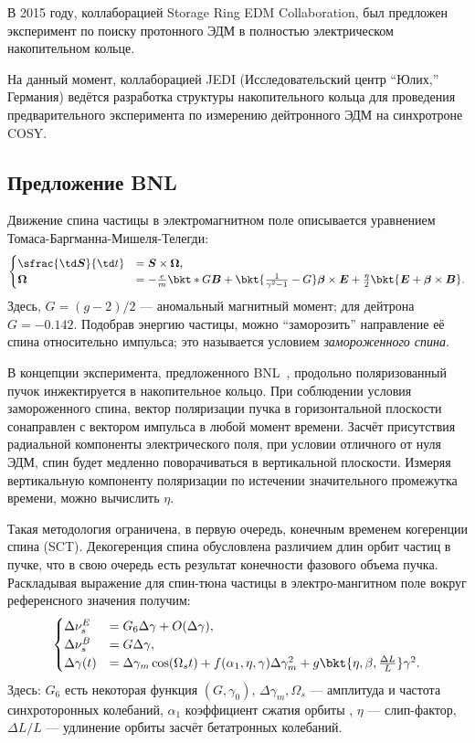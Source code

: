 \documentclass{article}
\newcommand{\bld}{\boldsymbol}
\begin{document}
	В 2015 году, коллаборацией Storage Ring EDM Collaboration, был предложен эксперимент по поиску протонного ЭДМ в полностью электрическом накопительном кольце.~\cite{Proton_EDM}
	
	На данный момент, коллаборацией JEDI (Исследовательский центр ``Юлих,'' Германия) ведётся разработка структуры накопительного кольца для проведения предварительного эксперимента по измерению дейтронного ЭДМ на синхротроне COSY.
	
	\subsection{Предложение BNL}
	Движение спина частицы в электромагнитном поле описывается уравнением Томаса-Баргманна-Мишеля-Телегди:
	\begin{equation*}
	\begin{cases}
	\sfrac{\td\bld S}{\td t} &=\bld S \times\bld \Omega,\\
	\bld \Omega &= -\frac em \bkt*{G\bld B + \bkt{\frac 1 {\gamma^2 - 1} - G}\bld \beta \times\bld E + \frac\eta2 \bkt{\bld E +\bld\beta\times\bld B}}.
	\end{cases}
	\end{equation*}
	Здесь, $G = (g-2)/2$ --- аномальный магнитный момент; для дейтрона $G = -0.142$. Подобрав энергию частицы, можно ``заморозить'' направление её спина относительно импульса; это называется условием \emph{замороженного спина}.
	
	В концепции эксперимента, предложенного BNL~\cite{BNL}, продольно поляризованный пучок инжектируется в накопительное кольцо. При соблюдении условия замороженного спина, вектор поляризации пучка в горизонтальной плоскости сонаправлен с вектором импульса в любой момент времени. Засчёт присутствия радиальной компоненты электрического поля, при условии отличного от нуля ЭДМ, спин будет медленно поворачиваться в вертикальной плоскости. Измеряя вертикальную компоненту поляризации по истечении значительного промежутка времени, можно вычислить $\eta$. 
	
	Такая методология ограничена, в первую очередь, конечным временем когеренции спина (SCT). Декогеренция спина обусловлена различием длин орбит частиц в пучке, что в свою очередь есть результат конечности фазового объема пучка. Раскладывая выражение для спин-тюна частицы в электро-мангитном поле вокруг референсного значения получим:~\cite{SenichevRuPAC2016}
	\begin{equation*}
		\begin{cases}
		\Delta\nu_s^E &= G_6\Delta\gamma + O(\Delta\gamma),\\
		\Delta\nu_s^B &= G\Delta\gamma,\\
		\Delta\gamma(t) &= \Delta\gamma_m\cos(\Omega_s t) + f(\alpha_1, \eta, \gamma)\Delta\gamma_m^2 + g\bkt{\eta, \beta, \frac{\Delta L}{L}}\gamma^2.
		\end{cases}
	\end{equation*}
	Здесь: $G_6$ есть некоторая функция $(G, \gamma_0)$, $\Delta\gamma_m, \Omega_s$ --- амплитуда и частота синхроторонных колебаний, $\alpha_1$ коэффициент сжатия орбиты , $\eta$ --- слип-фактор, $\Delta L/L$ --- удлинение орбиты засчёт бетатронных колебаний.
	
\end{document}
